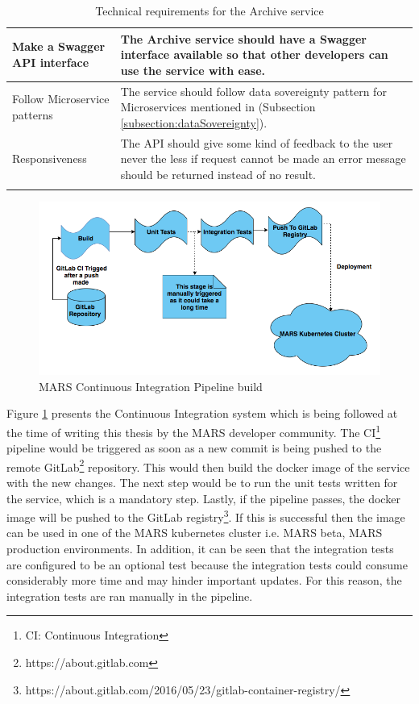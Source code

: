 \begin{longtable}{|p{3cm}|p{12cm}|}
            \hline
                 Make a Swagger API interface & The Archive service should have a Swagger \cite{swagger} interface available so that other 
                 developers can use the service with ease.\\         
            \hline
                Follow Microservice patterns & The service should follow data sovereignty pattern for Microservices mentioned in 
                (Subsection \ref{subsection:dataSovereignty}).\\ 
            \hline
                Responsiveness & The API should give some kind of feedback to the user never the less if request cannot be made an 
                error message should be returned instead of no result. \\      
            \hline
        \caption{Technical requirements for the Archive service}
        \label{table: Technical Requirements}     
    \end{longtable} 
  
    \begin{figure}[H]
        \centering \includegraphics[scale=0.5]{grafiken/CIbuild.png}
        \caption{MARS Continuous Integration Pipeline build}
        \label{fig:CIbuild}
    \end{figure}

    Figure \ref{fig:CIbuild} presents the Continuous Integration system which is being followed at the time of writing this thesis by the MARS developer community.
    The CI\footnote{CI: Continuous Integration} pipeline would be triggered as soon as a new commit is being pushed to the remote 
    GitLab\footnote{https://about.gitlab.com} repository. This would then build the docker image of the service with the new changes. The next step would be to
    run the unit tests written for the service, which is a mandatory step. Lastly, if the pipeline passes, the docker image will be pushed
    to the GitLab registry\footnote{https://about.gitlab.com/2016/05/23/gitlab-container-registry/}. If this is successful then the image can be used in one of 
    the MARS kubernetes cluster i.e. MARS beta, MARS production environments. In addition,
    it can be seen that the integration tests are configured to be an optional test because the integration tests could consume considerably more time and may hinder
    important updates. For this reason, the integration tests are ran manually in the pipeline.